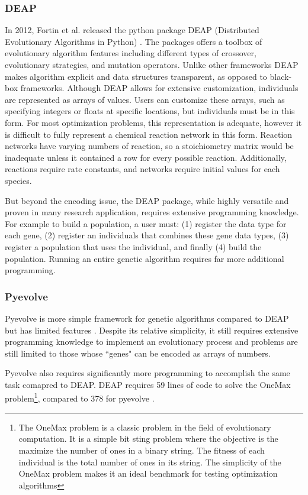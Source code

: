 \documentclass[12pt]{report}
\begin{document}
\subsubsection{DEAP}
In 2012, Fortin et al. released the python package DEAP (Distributed Evolutionary Algorithms in Python) \cite{DEAP_JMLR2012}. The packages offers a toolbox of evolutionary algorithm features including different types of crossover, evolutionary strategies, and mutation operators. Unlike other frameworks DEAP makes algorithm explicit and data structures transparent, as opposed to black-box frameworks. Although DEAP allows for extensive customization, individuals are represented as arrays of values. Users can customize these arrays, such as specifying integers or floats at specific locations, but individuals must be in this form. For most optimization problems, this representation is adequate, however it is difficult to fully represent a chemical reaction network in this form. Reaction networks have varying numbers of reaction, so a stoichiometry matrix would be inadequate unless it contained a row for every possible reaction. Additionally, reactions require rate constants, and networks require initial values for each species. 

But beyond the encoding issue, the DEAP package, while highly versatile and proven in many research application, requires extensive programming knowledge. For example to build a population, a user must: (1) register the data type for each gene, (2) register an individuals that combines these gene data types, (3) register a population that uses the individual, and finally (4) build the population. Running an entire genetic algorithm requires far more additional programming. 

\subsubsection{Pyevolve}
Pyevolve is more simple framework for genetic algorithms compared to DEAP but has limited features \cite{pyevolve}. Despite its relative simplicity, it still requires extensive programming knowledge to implement an evolutionary process and problems are still limited to those whose ``genes" can be encoded as arrays of numbers. 

Pyevolve also requires significantly more programming to accomplish the same task comapred to DEAP. DEAP requires 59 lines of code to solve the OneMax problem\footnote{The OneMax problem is a classic problem in the field of evolutionary computation. It is a simple bit sting problem where the objective is the maximize the number of ones in a binary string. The fitness of each individual is the total number of ones in its string. The simplicity of the OneMax problem makes it an ideal benchmark for testing optimization algorithms}, compared to 378 for pyevolve \cite{LEAP}. 
\end{document}
